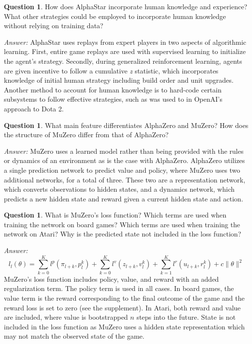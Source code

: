 \documentclass{article}
\theoremstyle{definition}
\newtheorem{question}[thm]{Question}
\newenvironment{answer}{\noindent\textit{Answer:}}{}
\begin{document}
\begin{question}
How does AlphaStar incorporate human knowledge and experience? What other strategies could be employed to incorporate human knowledge without relying on training data?  
\end{question}

\begin{answer}
AlphaStar uses replays from expert players in two aspects of algorithmic learning. First, entire game replays are used with supervised learning to initialize the agent's strategy. Secondly, during generalized reinforcement learning, agents are given incentive to follow a cumulative \textit{z} statistic, which incorporates knowledge of initial human strategy including build order and unit upgrades. Another method to account for human knowledge is to hard-code certain subsystems to follow effective strategies, such as was used to in OpenAI's approach to Dota 2. 
\end{answer}

\begin{question}
What main feature differentiates AlphaZero and MuZero? How does the structure of MuZero differ from that of AlphaZero?
\end{question}

\begin{answer}
MuZero uses a learned model rather than being provided with the rules or dynamics of an environment as is the case with AlphaZero. AlphaZero utilizes a single prediction network to predict value and policy, where MuZero uses two additional networks, for a total of three. These two are a representation network, which converts observations to hidden states, and a dynamics network, which predicts a new hidden state and reward given a current hidden state and action.
\end{answer}

\begin{question}
What is MuZero’s loss function? Which terms are used when training the network on board games? Which terms are used when training the network on Atari? Why is the predicted state not included in the loss function?
\end{question}

\begin{answer}
\begin{equation*}
l_{l}(\theta)=\sum_{k=0}^{K} l^{p}\left(\pi_{l+k}, p_{l}^{k}\right)+\sum_{k=0}^{K} l^{v}\left(z_{l+k}, v_{l}^{k}\right)+\sum_{k=1}^{K} l^{r}\left(u_{l+k}, r_{l}^{k}\right)+c\|\theta\|^{2}
\end{equation*}
MuZero's loss function includes policy, value, and reward with an added regularization term. The policy term is used in all cases. In board games, the value term is the reward corresponding to the final outcome of the game and the reward loss is set to zero (see the supplement). In Atari, both reward and value are included, where value is bootstrapped $n$ steps into the future. State is not included in the loss function as MuZero uses a hidden state representation which may not match the observed state of the game.
\end{answer}
\end{document}
